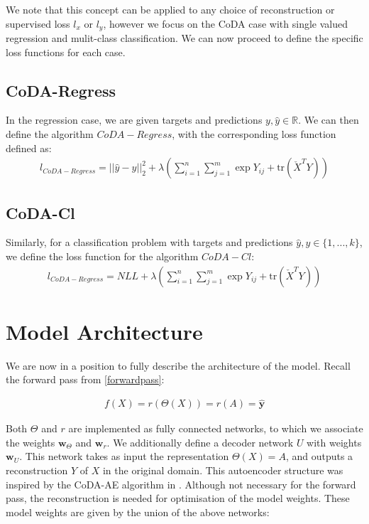 We note that this concept can be applied to any choice of reconstruction or supervised loss $l_{x}$ or $l_{y}$, however we focus on the CoDA case with single valued regression and mulit-class classification. We can now proceed to define the specific loss functions for each case.   


\subsection{CoDA-Regress}

In the regression case, we are given targets and predictions $y, \hat{y} \in \mathbb{R}$. We can then define the algorithm $CoDA-Regress$, with the corresponding loss function defined as:  
\begin{align}
   l_{CoDA-Regress} =||\hat{y} - y||^2_2 + \lambda  \left(\sum_{i=1}^n\sum_{j=1}^m\exp{Y_{ij}} + \text{tr}(\check{X}^TY)\right) 
\end{align}

\subsection{CoDA-Cl}

Similarly, for a classification problem with targets and predictions $\hat{y}, y \in \{1,...,k\}$, we define the loss function for the algorithm $CoDA-Cl$:  
\begin{align}
   l_{CoDA-Regress} = NLL + \lambda  \left(\sum_{i=1}^n\sum_{j=1}^m\exp{Y_{ij}} + \text{tr}(\check{X}^TY)\right) 
\end{align}

\section{Model Architecture}
\label{architecture}
We are now in a position to fully describe the architecture of the model. Recall the forward pass from \ref{forwardpass}: 

\begin{align*}
    f(X) = r(\Theta(X)) = r(A) = \mathbf{\hat{y}}
\end{align*}

Both $\Theta$ and $r$ are implemented as fully connected networks, to which we associate the weights $\mathbf{w}_\Theta$  and $\mathbf{w}_r$. We additionally define a decoder network $U$ with weights $\mathbf{w}_U$. This network takes as input the representation $\Theta(X) = A$, and outputs a reconstruction $Y$ of $X$ in the original domain. This autoencoder structure was inspired by the CoDA-AE algorithm in \cite{Avalos2018}. Although not necessary for the forward pass, the reconstruction is needed for optimisation of the model weights. These model weights are  given by the union of the above networks: 

